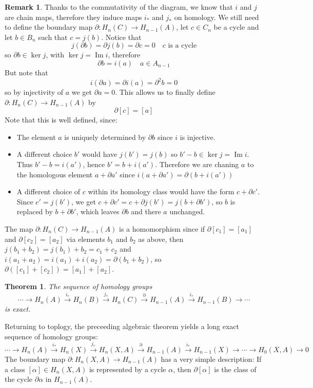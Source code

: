 \documentclass[11pt,a4paper]{article}
\theoremstyle{definition}
\newtheorem{remark}[definition]{Remark}
\theoremstyle{plain}
\newtheorem{theorem}[definition]{Theorem}
\theoremstyle{remark}
\begin{document}
\begin{remark}
Thanks to the commutativity of the diagram, we know that $i$ and $j$ are chain maps, therefore 
they induce maps $i_*$ and $j_*$ on homology. We still need to define the boundary map 
$\partial \colon H_n(C) \to H_{n-1} (A)$, let $c \in C_n$ be a cycle and let $b \in B_n$ such that 
$c = j(b)$. Notice that 
$$j(\partial b) = \partial j(b) = \partial c = 0 \quad \text{$c$ is a cycle}$$
so $\partial b \in \ker j$, with $\ker j = \operatorname{Im} i$, therefore 
$$\partial b = i(a) \quad a \in A_{n-1}$$
But note that 
$$i(\partial a) = \partial i(a) = \partial ^2 b = 0$$
so by injectivity of $a$ we get $\partial a = 0$. This allows us to finally define 
$\partial \colon H_n (C) \to H_{n-1} (A)$ by 
$$\partial [c] = [a]$$
Note that this is well defined, since: 
\begin{itemize}
  \item The element $a$ is uniquely determined by $\partial b$ since $i$ is injective. 
  \item A different choice $b'$ would have $j(b') = j(b)$ so $b' - b \in \ker j = \operatorname{Im} i$. 
  Thus $b' - b = i(a')$, hence $b' = b + i(a')$. Therefore we are chaning $a$ to the homologous element 
  $a + \partial a'$ since $i (a + \partial a')  = \partial (b + i(a'))$
  \item A different choice of $c$ within its homology class would have the form $c + \partial c'$. 
  Since $c' = j(b')$, we get $c + \partial c' = c + \partial j(b') = j(b + \partial b')$, 
  so $b$ is replaced by $b + \partial b'$, which leaves $\partial b$ and there $a$ unchanged. 
\end{itemize}
The map $\partial \colon H_n (C) \to H_{n-1} (A)$ is a homomorphism since if $\partial [c_1] = [a_1]$ and 
$\partial [c_2] = [a_2]$ via elements $b_1$ and $b_2$ as above, then $j(b_1 + b_2) = j(b_1) + b_2 = c_1 + c_2$ 
and $i(a_1 + a_2) = i(a_1) + i(a_2) = \partial (b_1 + b_2)$, so $\partial ([c_1] + [c_2]) = [a_1] + [a_2]$. 

\begin{theorem}
  The sequence of homology groups 
  $$\cdots \rightarrow H_n(A) \xrightarrow{i_*} H_n(B) \xrightarrow{j_*} H_n (C) \xrightarrow{\partial} H_{n-1} (A) \xrightarrow{i_*} H_{n-1} (B) \rightarrow \cdots$$
  is exact. 
\end{theorem}

Returning to toplogy, the preceeding algebraic theorem yields a long exact sequence of homology groups: 
$$\cdots \rightarrow H_n(A) \xrightarrow{i_*} H_n(X) \xrightarrow{j_*} H_n (X,A) \xrightarrow{\partial} H_{n-1} (A) \xrightarrow{i_*} H_{n-1} (X) \to \cdots \to H_0(X,A) \to 0$$
The boundary map $\partial \colon H_n(X,A) \to H_{n-1} (A)$ has a very simple description: 
If a class $[\alpha] \in H_n(X,A)$ is represented by a cycle $\alpha$, then $\partial [\alpha]$ is the class of the cycle $\partial \alpha$ in 
$H_{n-1} (A)$. 


\end{remark}
\end{document}
